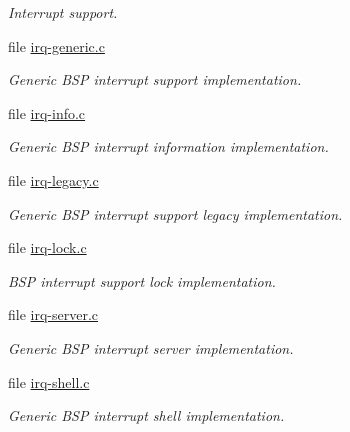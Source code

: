 \begin{DoxyCompactItemize}
\begin{DoxyCompactList}\small\item\em Interrupt support. \end{DoxyCompactList}\item 
file \mbox{\hyperlink{irq-generic_8c}{irq-\/generic.\+c}}
\begin{DoxyCompactList}\small\item\em Generic B\+SP interrupt support implementation. \end{DoxyCompactList}\item 
file \mbox{\hyperlink{irq-info_8c}{irq-\/info.\+c}}
\begin{DoxyCompactList}\small\item\em Generic B\+SP interrupt information implementation. \end{DoxyCompactList}\item 
file \mbox{\hyperlink{irq-legacy_8c}{irq-\/legacy.\+c}}
\begin{DoxyCompactList}\small\item\em Generic B\+SP interrupt support legacy implementation. \end{DoxyCompactList}\item 
file \mbox{\hyperlink{irq-lock_8c}{irq-\/lock.\+c}}
\begin{DoxyCompactList}\small\item\em B\+SP interrupt support lock implementation. \end{DoxyCompactList}\item 
file \mbox{\hyperlink{irq-server_8c}{irq-\/server.\+c}}
\begin{DoxyCompactList}\small\item\em Generic B\+SP interrupt server implementation. \end{DoxyCompactList}\item 
file \mbox{\hyperlink{irq-shell_8c}{irq-\/shell.\+c}}
\begin{DoxyCompactList}\small\item\em Generic B\+SP interrupt shell implementation. \end{DoxyCompactList}\end{DoxyCompactItemize}
